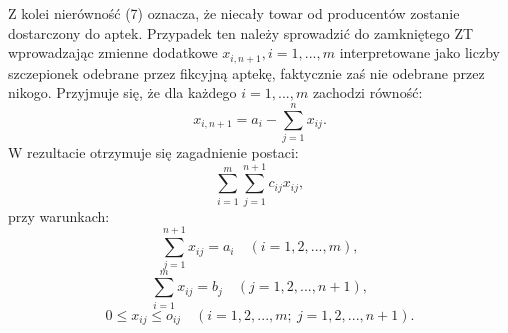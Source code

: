 \documentclass[11pt]{article}
\begin{document}
Z kolei nierówność (7) oznacza, że niecały towar od producentów zostanie dostarczony do aptek. Przypadek ten należy sprowadzić do zamkniętego ZT wprowadzając zmienne dodatkowe $x_{i,n+1}, i = 1,..., m$ interpretowane jako liczby szczepionek odebrane przez fikcyjną aptekę, faktycznie zaś nie odebrane przez nikogo. Przyjmuje się, że dla każdego $i=1,..., m$ zachodzi równość:
\begin{equation}
    x_{i,n+1}=a_{i}-\sum\limits_{j=1}^{n} x_{ij}.
\end{equation}
W rezultacie otrzymuje się zagadnienie postaci:
\begin{equation}
    \sum\limits_{i=1}^{m}\sum\limits_{j=1}^{n+1}c_{ij}x_{ij},
\end{equation}
przy warunkach:
\begin{equation}
    \sum\limits_{j=1}^{n+1} x_{ij} = a_{i} \quad (i = 1, 2,..., m),
\end{equation}
\begin{equation}
    \sum\limits_{i=1}^{m} x_{ij} = b_{j} \quad (j = 1, 2,..., n+1),
\end{equation}
\begin{equation}
    0 \leq x_{ij} \leq o_{ij} \quad (i = 1, 2,..., m; \ j = 1, 2,..., n+1).
\end{equation}

\end{document}
